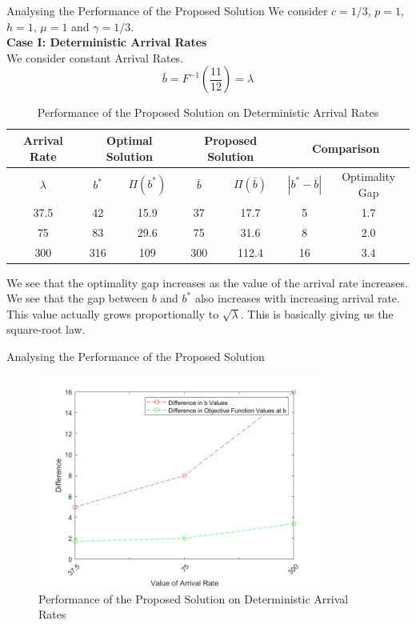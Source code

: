 \documentclass[9pt]{beamer}
\begin{document}
\begin{frame}{Analysing the Performance of the Proposed Solution}
We consider $c=1/3$, $p=1$, $h=1$, $\mu=1$ and $\gamma=1/3$. \\ \bigskip
\textbf{Case I: Deterministic Arrival Rates} \\
We consider constant Arrival Rates.
\[\bar{b}=F^{-1}(\frac{11}{12})= \lambda \]
\begin{table}
\small
            \begin{tabular}{|c||c|c|c|c|c|c|}
            \hline
            Arrival Rate &  \multicolumn{2}{|c|}{Optimal Solution} & \multicolumn{2}{|c|}{Proposed Solution}& \multicolumn{2}{|c|}{Comparison} \\
            \hline
                $\lambda$& $b^*$ & $\Pi(b^*)$ & $\bar{b}$& $\Pi(\bar{b})$& $|b^*-\bar{b}|$& Optimality Gap\\ 
                    \hline \hline
                    37.5 & 42 & 15.9 & 37 & 17.7 & 5& 1.7\\
                    75 & 83 & 29.6 & 75 & 31.6 & 8& 2.0\\
                    300 & 316 & 109 & 300 & 112.4 & 16& 3.4\\
            \hline
            \end{tabular} 
            \caption{Performance of the Proposed Solution on Deterministic Arrival Rates}            
\end{table}
We see that the optimality gap increases as the value of the arrival rate increases. We see that the gap between $b$ and $b^*$ also increases with increasing arrival rate. This value actually grows proportionally to $\sqrt{\lambda}$. This is basically giving us the square-root law.
\end{frame} 

\begin{frame}{Analysing the Performance of the Proposed Solution}

\begin{figure}[hbt!]
\includegraphics[height=7cm]{correctedDet.jpg}
\caption{Performance of the Proposed Solution on Deterministic Arrival Rates}
\end{figure}
\end{frame} 
\end{document}
